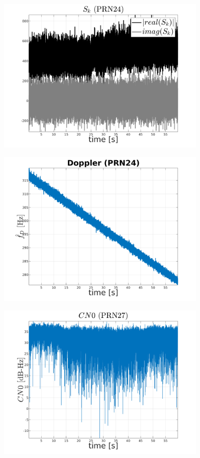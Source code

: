 \begin{figure}[H]
	\centering
	\includegraphics[width=0.9\textwidth]{fig/sk_PRN24.png}
\end{figure}

\begin{figure}[H]
	\centering
	\includegraphics[width=0.9\textwidth]{fig/doppler_PRN24.png}
\end{figure}

\begin{figure}[H]
	\centering
	\includegraphics[width=0.9\textwidth]{fig/CN0_PRN27.png}
\end{figure}

